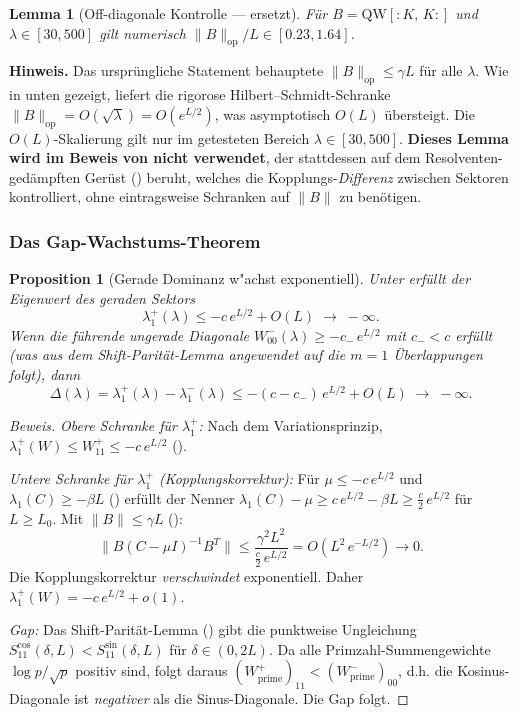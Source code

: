 ﻿\documentclass[12pt,a4paper]{article}
\newtheorem{lemma}[theorem]{Lemma}
\newtheorem{proposition}[theorem]{Proposition}
\theoremstyle{definition}
\theoremstyle{remark}
\begin{document}
\begin{lemma}[Off-diagonale Kontrolle --- ersetzt]
\label{lem:L3}
Für $B = \mathrm{QW}[{:}K,\,K{:}]$ und $\lambda \in [30, 500]$ gilt numerisch $\|B\|_{\mathrm{op}}/L \in [0.23, 1.64]$.
\end{lemma}

\noindent\textbf{Hinweis.} Das ursprüngliche Statement behauptete $\|B\|_{\mathrm{op}} \leq \gamma L$ für alle $\lambda$. Wie in  unten gezeigt, liefert die rigorose Hilbert--Schmidt-Schranke $\|B\|_{\mathrm{op}} = O(\sqrt{\lambda}) = O(e^{L/2})$, was asymptotisch $O(L)$ übersteigt. Die $O(L)$-Skalierung gilt nur im getesteten Bereich $\lambda \in [30, 500]$. \textbf{Dieses Lemma wird im Beweis von  nicht verwendet}, der stattdessen auf dem Resolventen-gedämpften Gerüst () beruht, welches die Kopplungs-\emph{Differenz} zwischen Sektoren kontrolliert, ohne eintragsweise Schranken auf $\|B\|$ zu benötigen.

\subsubsection{Das Gap-Wachstums-Theorem}

\begin{proposition}[Gerade Dominanz w"achst exponentiell]
\label{prop:gap-growth}
Unter  erfüllt der Eigenwert des geraden Sektors
\[
  \lambda_1^+(\lambda) \leq -c\,e^{L/2} + O(L) \;\to\; -\infty.
\]
Wenn die führende ungerade Diagonale $W_{00}^-(\lambda) \geq -c_-\,e^{L/2}$ mit $c_- < c$ erfüllt (was aus dem Shift-Parität-Lemma angewendet auf die $m=1$ Überlappungen folgt), dann
\begin{equation}
\label{eq:gap-exp}
  \Delta(\lambda) = \lambda_1^+(\lambda) - \lambda_1^-(\lambda) \leq -(c - c_-)\,e^{L/2} + O(L) \;\to\; -\infty.
\end{equation}
\end{proposition}

\begin{proof}[Beweis]
\emph{Obere Schranke für $\lambda_1^+$:} Nach dem Variationsprinzip, $\lambda_1^+(W) \leq W_{11}^+ \leq -c\,e^{L/2}$ ().

\emph{Untere Schranke für $\lambda_1^+$ (Kopplungskorrektur):} Für $\mu \leq -c\,e^{L/2}$ und $\lambda_1(C) \geq -\beta L$ () erfüllt der Nenner $\lambda_1(C) - \mu \geq c\,e^{L/2} - \beta L \geq \tfrac{c}{2}\,e^{L/2}$ für $L \geq L_0$. Mit $\|B\| \leq \gamma L$ ():
\[
  \|B(C - \mu I)^{-1}B^T\| \leq \frac{\gamma^2 L^2}{\frac{c}{2}\,e^{L/2}} = O(L^2\,e^{-L/2}) \to 0.
\]
Die Kopplungskorrektur \emph{verschwindet} exponentiell. Daher $\lambda_1^+(W) = -c\,e^{L/2} + o(1)$.

\emph{Gap:} Das Shift-Parität-Lemma () gibt die punktweise Ungleichung $S_{11}^{\cos}(\delta, L) < S_{11}^{\sin}(\delta, L)$ für $\delta \in (0, 2L)$. Da alle Primzahl-Summengewichte $\log p / \sqrt{p}$ positiv sind, folgt daraus $(W_{\mathrm{prime}}^+)_{11} < (W_{\mathrm{prime}}^-)_{00}$, d.h. die Kosinus-Diagonale ist \emph{negativer} als die Sinus-Diagonale. Die Gap folgt.
\end{proof}
\end{document}
